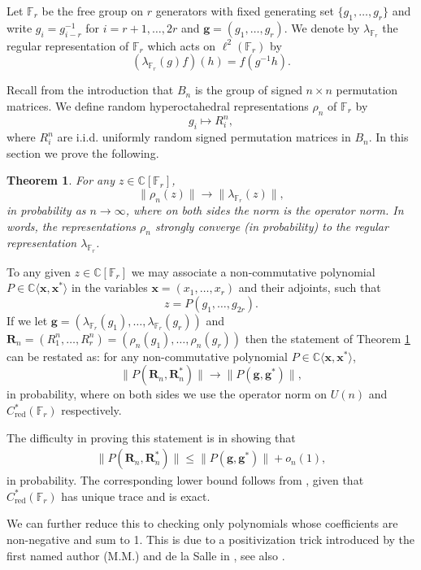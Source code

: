\documentclass[12pt]{article}
\newtheorem{theorem}{Theorem}[section]
\newcommand{\C}{\mathbb{C}}
\newcommand{\F}{\mathbb{F}}
\newcommand{\1}{\mathds{1}}
\newcommand{\g}{\mathbf{g}}
\newcommand{\rn}{\mathbf{R}_n}
\begin{document}
Let $\F_r$ be the free group on $r$ generators with fixed generating set $\{g_1,\ldots,g_r\}$ and write $g_i=g^{-1}_{i-r}$ for $i=r+1,\ldots,2r$ and $\g=(g_1,\ldots, g_r)$. We denote by $\lambda_{\F_r}$ the regular representation of $\F_r$ which acts on $\ell^2(\F_r)$ by 
    $$\left(\lambda_{\F_r}(g)f\right)(h)=f(g^{-1}h).$$

Recall from the introduction that $B_n$ is the group of signed $n\times n$ permutation matrices. We define random hyperoctahedral representations $\rho_n$ of $\F_r$ by 
$$g_i\mapsto R_i^n,$$
where $R_i^n$ are i.i.d. uniformly random signed permutation matrices in $B_n$. 
In this section we prove the following.

\begin{theorem}
\label{thm: free-sc}
    For any $z\in \mathbb{C}[\F_r]$, 
        $$\|\rho_n(z)\|\to \|\lambda_{\F_r}(z)\|,$$
    in probability as $n\to\infty$, where on both sides the norm is the operator norm. In words, the representations $\rho_n$ strongly converge (in probability) to the regular representation $\lambda_{\F_r}$.
\end{theorem}

To any given $z\in \C[\F_r]$ we may associate a non-commutative polynomial $P\in \C\langle \mathbf{x},\mathbf{x}^*\rangle$ in the variables $\mathbf{x}=(x_1,\ldots,x_r)$ and their adjoints, such that
    $$z = P(g_1,\ldots, g_{2r}).$$
If we let $\g = (\lambda_{\F_r}(g_1),\ldots,\lambda_{\F_r}(g_r))$ and $\rn=(R_1^n,\ldots,R_r^n)=(\rho_n(g_1),\ldots,\rho_n(g_r))$ then the statement of Theorem \ref{thm: free-sc} can be restated as: for any non-commutative polynomial $P\in \C\langle \mathbf{x},\mathbf{x}^*\rangle$,
    $$\|P(\rn,\rn^*)\|\to\|P(\g,\g^*)\|,$$
in probability, where on both sides we use the operator norm on $U(n)$ and $C^*_{\mathrm{red}}(\F_r)$ respectively.

The difficulty in proving this statement is in showing that 
    \begin{align}
    \label{eq: sc-upper-bd}
    \|P(\rn,\rn^*)\|\leq\|P(\g,\g^*)\|+o_n(1),
    \end{align}
in probability. The corresponding lower bound follows from \cite[Lemma 5.14]{MageeSalle}, given that $C^*_{\mathrm{red}}(\F_r)$ has unique trace and is exact.

We can further reduce this to checking only polynomials whose coefficients are non-negative and sum to 1. This is due to a positivization trick introduced by the first named author (M.M.) and de la Salle in \cite[Proposition 6.3]{MageeSalle}, see also \cite[Lemma 2.26]{vanhandel2026strongconvergencephenomenon}. 
\end{document}
